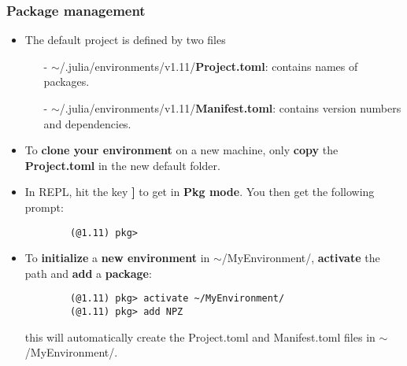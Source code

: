 \documentclass[t,usepdftitle=false]{beamer}
\begin{document}
\begin{frame}[fragile]
	\frametitle{Package management}
	\begin{itemize}
	\item The default project is defined by two files
	\begin{itemize}\normalsize
		\item[-] {\scriptsize$\sim$}/.julia/environments/v1.11/\textbf{Project.toml}: contains names of packages.
		\item[-] {\scriptsize$\sim$}/.julia/environments/v1.11/\textbf{Manifest.toml}: contains version numbers and dependencies.
	\end{itemize}
	\item To \textbf{clone your environment} on a new machine, only \textbf{copy} the \textbf{Project.toml} in the new default
	folder.
	\vspace{.15cm}
	\item In REPL, hit the key \textbf{]} to get in \textbf{Pkg mode}. You then get the following prompt:
	\vspace{.1cm}
	\begin{verbatim}
		(@1.11) pkg> 
	\end{verbatim}
	\normalsize			
	\vspace{.1cm}
	\item To \textbf{initialize} a \textbf{new environment} in {\scriptsize$\sim$}/MyEnvironment/, \textbf{activate} the path and \textbf{add} a
	\textbf{package}:
	\vspace{.1cm}
	\begin{verbatim}
		(@1.11) pkg> activate ~/MyEnvironment/
		(@1.11) pkg> add NPZ
	\end{verbatim}
	\normalsize		
	this will automatically create the Project.toml and Manifest.toml files in {\scriptsize$\sim$}/MyEnvironment/.
\end{itemize}
\end{frame}  
\end{document}
